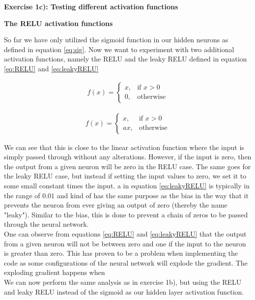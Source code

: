 \documentclass[12pt,a4paper]{article}
\begin{document}
\newpage

\begin{center}
\Large{\textbf{Exercise 1c): Testing different activation functions}}
\end{center}

\begin{center}
\large{\textbf{The RELU activation functions}}
\end{center}

\noindent So far we have only utilized the sigmoid function in our hidden neurons as defined in equation \ref{eq:sig}. Now we want to experiment with two additional activation functions, namely the RELU and the leaky RELU defined in equation \ref{eq:RELU} and \ref{eq:leakyRELU}

\begin{equation}\label{eq:RELU}
\begin{aligned}
f(x) = 
\begin{cases}
x,& \text{if } x > 0\\
0,& \text{otherwise}
\end{cases}
\end{aligned}
\end{equation}

\begin{equation}\label{eq:leakyRELU}
\begin{aligned}
f(x) = 
\begin{cases}
x,& \text{if } x > 0\\
ax,& \text{otherwise}
\end{cases}
\end{aligned}
\end{equation}

\noindent We can see that this is close to the linear activation function where the input is simply passed through without any alterations. However, if the input is zero, then the output from a given neuron will be zero in the RELU case. The same goes for the leaky RELU case, but instead if setting the input values to zero, we set it to some small constant times the input. a in equation \ref{eq:leakyRELU} is typically in the range of $0.01$ and kind of has the same purpose as the bias in the way that it prevents the neuron from ever giving an output of zero (thereby the name "leaky"). Similar to the bias, this is done to prevent a chain of zeros to be passed through the neural network.
\\
One can observe from equations \ref{eq:RELU} and \ref{eq:leakyRELU} that the output from a given neuron will not be between zero and one if the input to the neuron is greater than zero. This has proven to be a problem when implementing the code as some configurations of the neural network will explode the gradient. The exploding gradient happens when 
\\
We can now perform the same analysis as in exercise 1b), but using the RELU and leaky RELU instead of the sigmoid as our hidden layer activation function.
\end{document}
